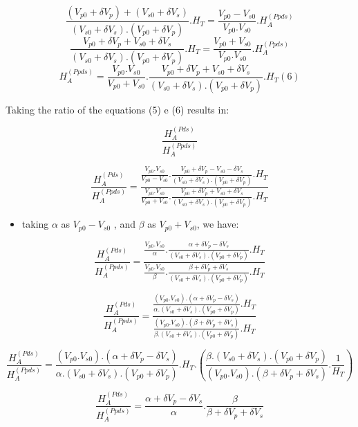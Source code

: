\documentclass[11pt]{article}
\providecommand{\tightlist}{%
      \setlength{\itemsep}{0pt}\setlength{\parskip}{0pt}}
\begin{document}
    \[
 \frac{(V_{p0} + \delta V_{p}) + (V_{s0} + \delta V_{s})}{(V_{s0} + \delta V_{s}) . (V_{p0} + \delta V_{p})} . H_{T} = \frac{V_{p0}-V_{s0}}{V_{p0} . V_{s0}} .  H_{A}^{(Ppds)}
\] \[
 \frac{V_{p0} + \delta V_{p} + V_{s0} + \delta V_{s}}{(V_{s0} + \delta V_{s}) . (V_{p0} + \delta V_{p})} . H_{T} = \frac{V_{p0} + V_{s0}}{V_{p0} . V_{s0}} .  H_{A}^{(Ppds)}
\] \[
H_{A}^{(Ppds)} = \frac{V_{p0} . V_{s0}}{V_{p0} + V_{s0}} . \frac{V_{p0} + \delta V_{p} + V_{s0} + \delta V_{s}}{(V_{s0} + \delta V_{s}) . (V_{p0} + \delta V_{p})} . H_{T} (6)
\] 

    Taking the ratio of the equations (5) e (6) results in:

    \[
\frac{H_{A}^{(Pds)}}{H_{A}^{(Ppds)}}
\] 

    \[
\frac{H_{A}^{(Pds)}}{H_{A}^{(Ppds)}} = \frac{\frac{V_{p0} . V_{s0}}{V_{p0}-V_{s0}} . \frac{V_{p0} + \delta V_{p} - V_{s0} - \delta V_{s}}{(V_{s0} + \delta V_{s}) . (V_{p0} + \delta V_{p})} . H_{T}}{\frac{V_{p0} . V_{s0}}{V_{p0} + V_{s0}} . \frac{V_{p0} + \delta V_{p} + V_{s0} + \delta V_{s}}{(V_{s0} + \delta V_{s}) . (V_{p0} + \delta V_{p})} . H_{T}}
\]

    \begin{itemize}
\tightlist
\item
  taking \(\alpha\) as \(V_{p0} − V_{s0}\) , and \(\beta\) as
  \(V_{p0} + V_{s0}\), we have:
\end{itemize}

    \[
\frac{H_{A}^{(Pds)}}{H_{A}^{(Ppds)}} = \frac{\frac{V_{p0} . V_{s0}}{\alpha} . \frac{\alpha + \delta V_{p} - \delta V_{s}}{(V_{s0} + \delta V_{s}) . (V_{p0} + \delta V_{p})} . H_{T}}{\frac{V_{p0} . V_{s0}}{\beta} . \frac{\beta + \delta V_{p} + \delta V_{s}}{(V_{s0} + \delta V_{s}) . (V_{p0} + \delta V_{p})} . H_{T}}
\] 

    \[
\frac{H_{A}^{(Pds)}}{H_{A}^{(Ppds)}} = \frac{\frac{(V_{p0} . V_{s0}) . (\alpha + \delta V_{p} - \delta V_{s})}{\alpha . (V_{s0} + \delta V_{s}) . (V_{p0} + \delta V_{p})} . H_{T}}{\frac{(V_{p0} . V_{s0}). (\beta + \delta V_{p} + \delta V_{s})}{\beta . (V_{s0} + \delta V_{s}) . (V_{p0} + \delta V_{p})} . H_{T}}
\]

    \[
\frac{H_{A}^{(Pds)}}{H_{A}^{(Ppds)}} = \frac{(V_{p0} . V_{s0}) . (\alpha + \delta V_{p} - \delta V_{s})}{\alpha . (V_{s0} + \delta V_{s}) . (V_{p0} + \delta V_{p})} . H_{T} . (\frac{\beta . (V_{s0} + \delta V_{s}) . (V_{p0} + \delta V_{p})}{(V_{p0} . V_{s0}). (\beta + \delta V_{p} + \delta V_{s})} . \frac{1}{H_{T}})
\]

    \[
\frac{H_{A}^{(Pds)}}{H_{A}^{(Ppds)}} = \frac{\alpha + \delta V_{p} - \delta V_{s}}{\alpha}. \frac{\beta}{\beta + \delta V_{p} + \delta V_{s}}
\]
\end{document}
